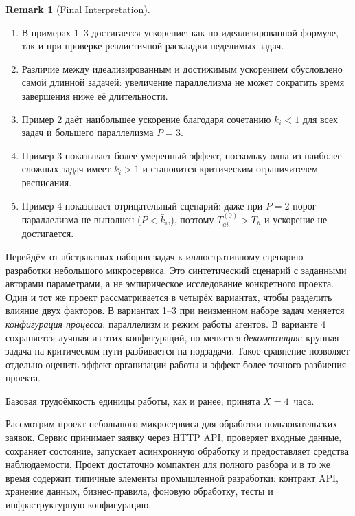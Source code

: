 \documentclass[12pt,a4paper]{article}
\theoremstyle{definition}
\newtheorem{remark}{Remark}
\begin{document}
\begin{remark}[Final Interpretation]
\begin{enumerate}
  \item В примерах 1--3 достигается ускорение: как по идеализированной формуле, так и при проверке реалистичной раскладки неделимых задач.
  \item Различие между идеализированным и достижимым ускорением обусловлено самой длинной задачей: увеличение параллелизма не может сократить время завершения ниже её длительности.
  \item Пример 2 даёт наибольшее ускорение благодаря сочетанию $k_i < 1$ для всех задач и большего параллелизма $P=3$.
  \item Пример 3 показывает более умеренный эффект, поскольку одна из наиболее сложных задач имеет $k_i > 1$ и становится критическим ограничителем расписания.
  \item Пример 4 показывает отрицательный сценарий: даже при $P=2$ порог параллелизма не выполнен ($P < \bar{k}_w$), поэтому $T_{ai}^{(0)} > T_h$ и ускорение не достигается.
\end{enumerate}
\end{remark}


Перейдём от абстрактных наборов задач к иллюстративному сценарию разработки
небольшого микросервиса. Это синтетический сценарий с заданными авторами
параметрами, а не эмпирическое исследование конкретного проекта. Один и тот же проект рассматривается
в четырёх вариантах, чтобы разделить влияние двух факторов. В вариантах 1--3
при неизменном наборе задач меняется \emph{конфигурация процесса}: параллелизм и
режим работы агентов. В варианте 4 сохраняется лучшая из этих конфигураций, но
меняется \emph{декомпозиция}: крупная задача на критическом пути разбивается на
подзадачи. Такое сравнение позволяет отдельно оценить эффект организации
работы и эффект более точного разбиения проекта.

Базовая трудоёмкость единицы работы, как и ранее, принята $X = 4$~часа.


Рассмотрим проект небольшого микросервиса для обработки пользовательских заявок. Сервис принимает заявку через HTTP API, проверяет входные данные, сохраняет состояние, запускает асинхронную обработку и предоставляет средства наблюдаемости. Проект достаточно компактен для полного разбора и в то же время содержит типичные элементы промышленной разработки: контракт API, хранение данных, бизнес-правила, фоновую обработку, тесты и инфраструктурную конфигурацию.
\end{document}
